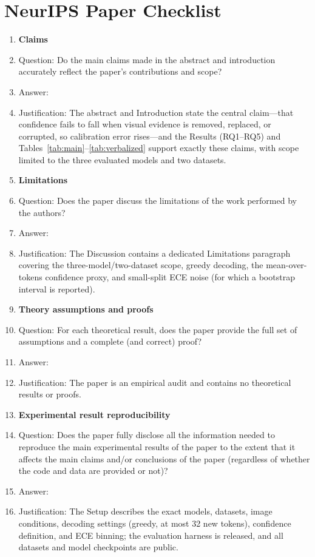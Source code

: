 \section*{NeurIPS Paper Checklist}

\begin{enumerate}

\item {\bf Claims}
    \item[] Question: Do the main claims made in the abstract and introduction accurately reflect the paper's contributions and scope?
    \item[] Answer: \answerYes{}
    \item[] Justification: The abstract and Introduction state the central claim---that confidence fails to fall when visual evidence is removed, replaced, or corrupted, so calibration error rises---and the Results (RQ1--RQ5) and Tables~\ref{tab:main}--\ref{tab:verbalized} support exactly these claims, with scope limited to the three evaluated models and two datasets.

\item {\bf Limitations}
    \item[] Question: Does the paper discuss the limitations of the work performed by the authors?
    \item[] Answer: \answerYes{}
    \item[] Justification: The Discussion contains a dedicated Limitations paragraph covering the three-model/two-dataset scope, greedy decoding, the mean-over-tokens confidence proxy, and small-split ECE noise (for which a bootstrap interval is reported).

\item {\bf Theory assumptions and proofs}
    \item[] Question: For each theoretical result, does the paper provide the full set of assumptions and a complete (and correct) proof?
    \item[] Answer: \answerNA{}
    \item[] Justification: The paper is an empirical audit and contains no theoretical results or proofs.

    \item {\bf Experimental result reproducibility}
    \item[] Question: Does the paper fully disclose all the information needed to reproduce the main experimental results of the paper to the extent that it affects the main claims and/or conclusions of the paper (regardless of whether the code and data are provided or not)?
    \item[] Answer: \answerYes{}
    \item[] Justification: The Setup describes the exact models, datasets, image conditions, decoding settings (greedy, at most 32 new tokens), confidence definition, and ECE binning; the evaluation harness is released, and all datasets and model checkpoints are public.


\end{enumerate}
